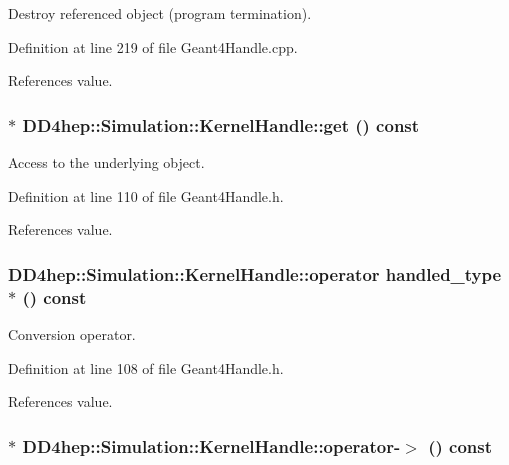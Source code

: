 Destroy referenced object (program termination). 

Definition at line 219 of file Geant4Handle.cpp.

References value.\hypertarget{class_d_d4hep_1_1_simulation_1_1_kernel_handle_a3e008dbc86ec2f729c49a83efdfdc520}{
\subsubsection[{get}]{$\ast$ DD4hep::Simulation::KernelHandle::get () const}}
\label{class_d_d4hep_1_1_simulation_1_1_kernel_handle_a3e008dbc86ec2f729c49a83efdfdc520}


Access to the underlying object. 

Definition at line 110 of file Geant4Handle.h.

References value.\hypertarget{class_d_d4hep_1_1_simulation_1_1_kernel_handle_a84f90b5670eefe7e6d864bfcb44bb78b}{
\subsubsection[{operator handled\_\-type $\ast$}]{\setlength{\rightskip}{0pt plus 5cm}DD4hep::Simulation::KernelHandle::operator {\bf handled\_\-type} $\ast$ () const}}
\label{class_d_d4hep_1_1_simulation_1_1_kernel_handle_a84f90b5670eefe7e6d864bfcb44bb78b}


Conversion operator. 

Definition at line 108 of file Geant4Handle.h.

References value.\hypertarget{class_d_d4hep_1_1_simulation_1_1_kernel_handle_a564370b54320769d1e879ab0adc09d82}{
\subsubsection[{operator-\/$>$}]{$\ast$ DD4hep::Simulation::KernelHandle::operator-\/$>$ () const}}
\label{class_d_d4hep_1_1_simulation_1_1_kernel_handle_a564370b54320769d1e879ab0adc09d82}


